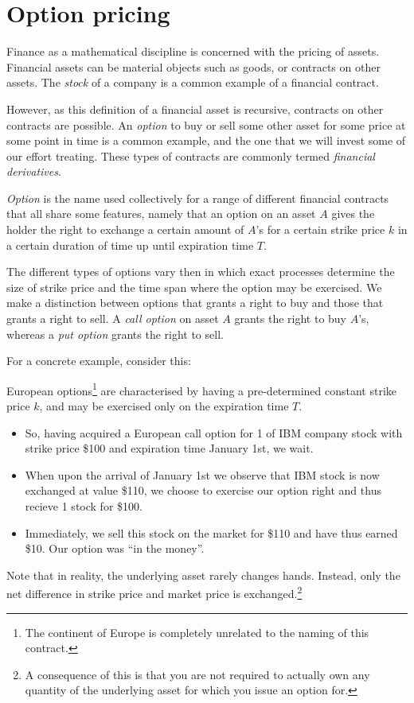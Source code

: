 \section{Option pricing}

Finance as a mathematical discipline is concerned with the pricing of assets.
Financial assets can be material objects such as goods, or contracts on other
assets. The \emph{stock} of a company is a common example of a financial contract.

However, as this definition of a financial asset is recursive, contracts on
other contracts are possible. An \emph{option} to buy or sell some other asset
for some price at some point in time is a common example, and the one that we
will invest some of our effort treating. These types of contracts are commonly
termed \emph{financial derivatives}.

\emph{Option} is the name used collectively for a range of different financial
contracts that all share some features, namely that an option on an asset $A$
gives the holder the right to exchange a certain amount of $A$'s for a certain
strike price $k$ in a certain duration of time up until expiration time $T$.

The different types of options vary then in which exact processes determine the
size of strike price and the time span where the option may be exercised.
We make a distinction between options that grants a right to buy and those that
grants a right to sell. A \emph{call option} on asset $A$ grants the right to
buy $A$'s, whereas a \emph{put option} grants the right to sell.

For a concrete example, consider this:
\begin{example}
  European options\footnote{The continent of Europe is completely unrelated to
  the naming of this contract.} are characterised by having a pre-determined
  constant strike price $k$, and may be exercised only on the expiration time
  $T$.

  \begin{itemize}
    \item So, having acquired a European call option for 1 of IBM company stock
      with strike price \$100 and expiration time January 1st, we wait.

    \item When upon the arrival of January 1st we observe that IBM stock is now
      exchanged at value \$110, we choose to exercise our option right and thus
      recieve 1 stock for \$100.

    \item Immediately, we sell this stock on the market for \$110 and have thus
      earned \$10. Our option was ``in the money''.
  \end{itemize}

  Note that in reality, the underlying asset rarely changes hands. Instead,
  only the net difference in strike price and market price is
  exchanged.\footnote{A consequence of this is that you are not required to
  actually own any quantity of the underlying asset for which you issue an
  option for.}
\end{example}

